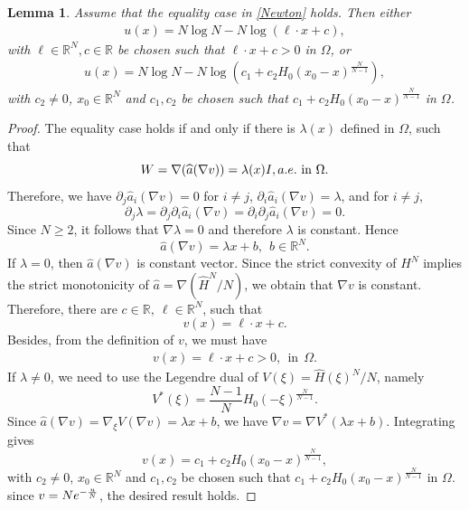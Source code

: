 \documentclass[10pt,a4paper]{amsart}
\numberwithin{equation}{section}
\newtheorem{lemma}[thm]{Lemma}
\newcommand{\R}{\mathbb{R}}
\newcommand{\e}{\textup{e}}
\begin{document}
\begin{lemma}\label{lem:equality-profile}
Assume that the equality case in \eqref{Newton} holds.  Then either
\begin{align*}
    u(x) = N \log N - N \log (\ell \cdot x + c),
\end{align*}
with $\ell \in \R^N, c \in \R$ be chosen such that $\ell \cdot x + c > 0 $ in $\Omega$, or
\begin{align*}
    u(x) = N \log N - N \log (c_1 + c_2 H_0(x_0-x)^{\frac{N}{N-1}}),
\end{align*}
with $c_2 \neq 0$, $x_0 \in \R^N$ and $c_1, c_2$ be chosen such that $c_1 + c_2 H_0(x_0-x)^{\frac{N}{N-1}} $ in $\Omega$.
\end{lemma}

\begin{proof}
The equality case holds if and only if there is $\lambda(x)$ defined in $\Omega$, such that
\[
       W=\nabla(\widehat a(\nabla v))=\lambda(x)I, a.e. \hbox{ in }\Omega.
\]
Therefore, we have $\partial_j \widehat{a}_i(\nabla v)=0$ for $i\ne j$, $\partial_i \widehat{a}_i(\nabla v)=\lambda$, and for $i\ne j$,
\[
    \partial_j\lambda =\partial_j \partial_i \widehat{a}_i(\nabla v)=\partial_i\partial_j \widehat{a}_i(\nabla v)=0.
\]
Since $N\ge2$, it follows that $\nabla\lambda=0$ and therefore $\lambda$ is constant. Hence
\[
       \widehat{a}(\nabla v)=\lambda x+b, \ \ b \in \R^N.
\]
If $\lambda=0$, then $\widehat{a}(\nabla v)$ is constant vector. Since the strict convexity of $H^N$ implies the strict monotonicity of $\widehat a=\nabla(\widehat H^N/N)$, we obtain that $\nabla v$ is constant. Therefore, there are $c \in \R, \  \ell \in \R^N$, such that
\[
    v(x) = \ell \cdot x + c.
\]
Besides, from the definition of $v$, we must have
\begin{align*}
    v(x) = \ell \cdot x + c > 0, \ \ \text{in} \ \ \Omega.
\end{align*}
If $\lambda \ne 0$, we need to use the Legendre dual of $V(\xi) = \widehat H(\xi)^N / N$, namely
\[
       V^*(\xi)=\frac{N-1}{N} H_0(-\xi)^{\frac{N}{N-1}}.
\]
Since $\widehat{a}(\nabla v)=\nabla_{\xi} V(\nabla v) = \lambda x + b$, we have $\nabla v=\nabla V^*(\lambda x+b)$.  Integrating gives
\[
       v(x) = c_1 + c_2 H_0(x_0-x)^{\frac{N}{N-1}},
\]
with $c_2 \neq 0$, $x_0 \in \R^N$ and $c_1, c_2$ be chosen such that $c_1 + c_2 H_0(x_0-x)^{\frac{N}{N-1}} $ in $\Omega$.  since $v = N \e^{-\frac{u}{N}}$, the desired result holds.
\end{proof}
\end{document}
